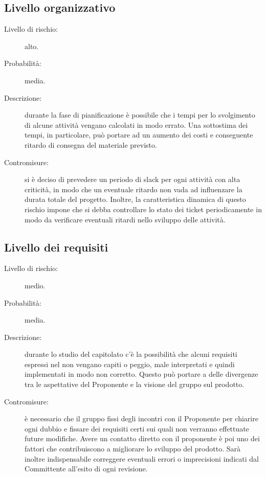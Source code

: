 \subsection{Livello organizzativo}
\begin{description}
	\item[Livello di rischio:] alto.
	\item[Probabilità:] media.
	\item[Descrizione:] durante la fase di pianificazione è possibile che i tempi per lo svolgimento di alcune attività vengano calcolati in modo errato. Una sottostima dei tempi, in particolare, può portare ad un aumento dei costi e conseguente ritardo di consegna del materiale previsto. 
	\item[Contromisure:] si è deciso di prevedere un periodo di slack per ogni attività con alta criticità, in modo che un eventuale ritardo non vada ad influenzare la durata totale del progetto. Inoltre, la caratteristica dinamica di questo rischio impone che si debba controllare lo stato dei ticket periodicamente in modo da verificare eventuali ritardi nello sviluppo delle attività. 
\end{description}

\subsection{Livello dei requisiti}
\begin{description}
	\item[Livello di rischio:] medio.
	\item[Probabilità:] media.
	\item[Descrizione:] durante lo studio del capitolato c'è la possibilità che alcuni requisiti espressi nel non vengano capiti o peggio, male interpretati e quindi implementati in modo non corretto. Questo può portare a delle divergenze tra le aspettative del Proponente e la visione del gruppo sul prodotto. 
	\item[Contromisure:] è necessario che il gruppo fissi degli incontri con il Proponente per chiarire ogni dubbio e fissare dei requisiti certi sui quali non verranno effettuate future modifiche. Avere un contatto diretto con il proponente è poi uno dei fattori che contribuiscono a migliorare lo sviluppo del prodotto. Sarà inoltre indispensabile correggere eventuali errori o imprecisioni indicati dal Committente all'esito di ogni revisione.  
\end{description}